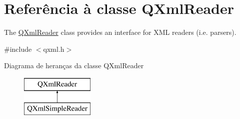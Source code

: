 \hypertarget{class_q_xml_reader}{\section{Referência à classe Q\-Xml\-Reader}
\label{class_q_xml_reader}
}


The \hyperlink{class_q_xml_reader}{Q\-Xml\-Reader} class provides an interface for X\-M\-L readers (i.\-e. parsers).  




{\ttfamily \#include $<$qxml.\-h$>$}

Diagrama de heranças da classe Q\-Xml\-Reader\begin{figure}[H]
\begin{center}
\leavevmode
\includegraphics[height=2.000000cm]{class_q_xml_reader}
\end{center}
\end{figure}
